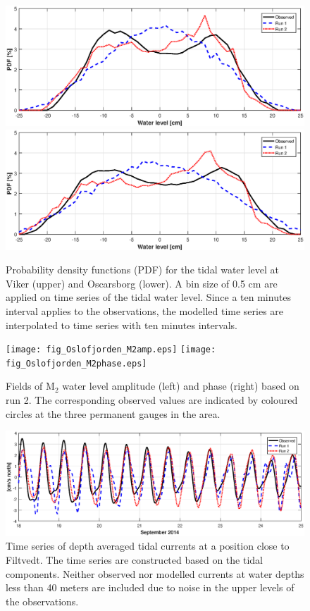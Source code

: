 \begin{figure}[!t]
\centering
\includegraphics[width=\textwidth]{fig_Viker_PDF}
\includegraphics[width=\textwidth]{fig_Oscarsborg_PDF}
\caption{Probability density functions (PDF) for the tidal water level at Viker (upper) and Oscarsborg (lower). A bin size of 0.5 cm are applied on time series of the tidal water level. Since a ten minutes interval applies to the observations, the modelled time series are interpolated to time series with ten minutes intervals.}
\label{fig:Oslo_PDF}
\end{figure}


\begin{figure}[!t]
\centering
\texttt{[image: fig\_Oslofjorden\_M2amp.eps]}
\texttt{[image: fig\_Oslofjorden\_M2phase.eps]}
\caption{Fields of M$_2$ water level amplitude (left) and phase (right) based on run 2. The corresponding observed values are indicated by coloured circles at the three permanent gauges in the area.}
\label{fig:Oslofjord_tidal_fields}
\end{figure}


\begin{figure}[!t]
\centering
\includegraphics[width=\textwidth]{fig_Filtvedt_timeseries}
\caption{Time series of depth averaged tidal currents at a position close to Filtvedt. The time series are constructed based on the tidal components. Neither observed nor modelled currents at water depths less than 40 meters are included due to noise in the upper levels of the observations.}
\label{fig:Filtvedt_timeseries}
\end{figure}



